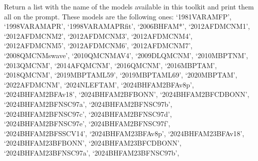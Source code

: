 \documentclass[letterpaper,10pt,english]{sphinxmanual}
\begin{document}
\begin{fulllineitems}
\label{\detokenize{source/api/setup_matter_micro:nucleardatapy.matter.setup_micro.micro_models}}
\pysigstartsignatures
{}
\pysigstopsignatures
\sphinxAtStartPar
Return a list with the name of the models available in this toolkit and     print them all on the prompt. These models are the following ones:     ‘1981\sphinxhyphen{}VAR\sphinxhyphen{}AM\sphinxhyphen{}FP’, ‘1998\sphinxhyphen{}VAR\sphinxhyphen{}AM\sphinxhyphen{}APR’, ‘1998\sphinxhyphen{}VAR\sphinxhyphen{}AM\sphinxhyphen{}APR\sphinxhyphen{}fit’, ‘2006\sphinxhyphen{}BHF\sphinxhyphen{}AM*’,     ‘2012\sphinxhyphen{}AFDMC\sphinxhyphen{}NM\sphinxhyphen{}1’, ‘2012\sphinxhyphen{}AFDMC\sphinxhyphen{}NM\sphinxhyphen{}2’, ‘2012\sphinxhyphen{}AFDMC\sphinxhyphen{}NM\sphinxhyphen{}3’, ‘2012\sphinxhyphen{}AFDMC\sphinxhyphen{}NM\sphinxhyphen{}4’,     ‘2012\sphinxhyphen{}AFDMC\sphinxhyphen{}NM\sphinxhyphen{}5’, ‘2012\sphinxhyphen{}AFDMC\sphinxhyphen{}NM\sphinxhyphen{}6’, ‘2012\sphinxhyphen{}AFDMC\sphinxhyphen{}NM\sphinxhyphen{}7’,     ‘2008\sphinxhyphen{}QMC\sphinxhyphen{}NM\sphinxhyphen{}swave’, ‘2010\sphinxhyphen{}QMC\sphinxhyphen{}NM\sphinxhyphen{}AV4’, ‘2009\sphinxhyphen{}DLQMC\sphinxhyphen{}NM’, ‘2010\sphinxhyphen{}MBPT\sphinxhyphen{}NM’,     ‘2013\sphinxhyphen{}QMC\sphinxhyphen{}NM’, ‘2014\sphinxhyphen{}AFQMC\sphinxhyphen{}NM’, ‘2016\sphinxhyphen{}QMC\sphinxhyphen{}NM’, ‘2016\sphinxhyphen{}MBPT\sphinxhyphen{}AM’,     ‘2018\sphinxhyphen{}QMC\sphinxhyphen{}NM’, ‘2019\sphinxhyphen{}MBPT\sphinxhyphen{}AM\sphinxhyphen{}L59’, ‘2019\sphinxhyphen{}MBPT\sphinxhyphen{}AM\sphinxhyphen{}L69’,     ‘2020\sphinxhyphen{}MBPT\sphinxhyphen{}AM’, ‘2022\sphinxhyphen{}AFDMC\sphinxhyphen{}NM’, ‘2024\sphinxhyphen{}NLEFT\sphinxhyphen{}AM’,     ‘2024\sphinxhyphen{}BHF\sphinxhyphen{}AM\sphinxhyphen{}2BF\sphinxhyphen{}Av8p’, ‘2024\sphinxhyphen{}BHF\sphinxhyphen{}AM\sphinxhyphen{}2BF\sphinxhyphen{}Av18’, ‘2024\sphinxhyphen{}BHF\sphinxhyphen{}AM\sphinxhyphen{}2BF\sphinxhyphen{}BONN’, ‘2024\sphinxhyphen{}BHF\sphinxhyphen{}AM\sphinxhyphen{}2BF\sphinxhyphen{}CDBONN’,     ‘2024\sphinxhyphen{}BHF\sphinxhyphen{}AM\sphinxhyphen{}2BF\sphinxhyphen{}NSC97a’, ‘2024\sphinxhyphen{}BHF\sphinxhyphen{}AM\sphinxhyphen{}2BF\sphinxhyphen{}NSC97b’, ‘2024\sphinxhyphen{}BHF\sphinxhyphen{}AM\sphinxhyphen{}2BF\sphinxhyphen{}NSC97c’, ‘2024\sphinxhyphen{}BHF\sphinxhyphen{}AM\sphinxhyphen{}2BF\sphinxhyphen{}NSC97d’,     ‘2024\sphinxhyphen{}BHF\sphinxhyphen{}AM\sphinxhyphen{}2BF\sphinxhyphen{}NSC97e’, ‘2024\sphinxhyphen{}BHF\sphinxhyphen{}AM\sphinxhyphen{}2BF\sphinxhyphen{}NSC97f’, ‘2024\sphinxhyphen{}BHF\sphinxhyphen{}AM\sphinxhyphen{}2BF\sphinxhyphen{}SSCV14’,    ‘2024\sphinxhyphen{}BHF\sphinxhyphen{}AM\sphinxhyphen{}23BF\sphinxhyphen{}Av8p’, ‘2024\sphinxhyphen{}BHF\sphinxhyphen{}AM\sphinxhyphen{}23BF\sphinxhyphen{}Av18’, ‘2024\sphinxhyphen{}BHF\sphinxhyphen{}AM\sphinxhyphen{}23BF\sphinxhyphen{}BONN’, ‘2024\sphinxhyphen{}BHF\sphinxhyphen{}AM\sphinxhyphen{}23BF\sphinxhyphen{}CDBONN’,     ‘2024\sphinxhyphen{}BHF\sphinxhyphen{}AM\sphinxhyphen{}23BF\sphinxhyphen{}NSC97a’, ‘2024\sphinxhyphen{}BHF\sphinxhyphen{}AM\sphinxhyphen{}23BF\sphinxhyphen{}NSC97b’, 
\end{fulllineitems}
\end{document}
